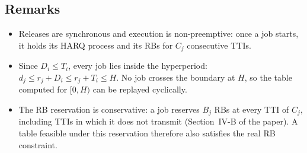 \subsection{Remarks}
\begin{itemize}
    \item Releases are synchronous and execution is non-preemptive: once a job
          starts, it holds its HARQ process and its RBs for $C_j$ consecutive
          TTIs.
    \item Since $D_i \le T_i$, every job lies inside the hyperperiod:
          $d_j \le r_j + D_i \le r_j + T_i \le H$. No job crosses the boundary
          at $H$, so the table computed for $[0, H)$ can be replayed
          cyclically.
    \item The RB reservation is conservative: a job reserves $B_j$ RBs at every
          TTI of $C_j$, including TTIs in which it does not transmit
          (Section~IV-B of the paper). A table feasible under this
          reservation therefore also satisfies the real RB constraint.
\end{itemize}
